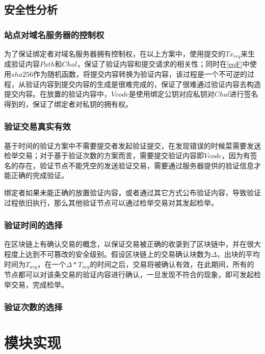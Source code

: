 \subsection{安全性分析}

\subsubsection{站点对域名服务器的控制权}

为了保证绑定者对域名服务器拥有控制权，在以上方案中，使用提交的$Tx_{req}$来生成验证内容$Path$和$Chal$，保证了验证内容和提交请求的相关性；同时在\eqref{eqF}中使用$sha256$作为随机函数，将提交内容转换为验证内容，该过程是一个不可逆的过程，从验证内容到提交内容的生成是很难完成的，保证了很难通过验证内容去构造提交内容。在放置的验证内容中，$Vcode$是使用绑定公钥对应私钥对$Chal$进行签名得到的，保证了绑定者对私钥的拥有权。


\subsubsection{验证交易真实有效}

基于时间的验证方案中不需要提交者发起验证提交，在发现错误的时候菜需要发送检举交易；对于基于验证次数的方案而言，需要提交验证内容即$Vcode$，因为有签名的存在，验证节点不能凭空的发送验证交易，需要通过服务器提供的验证信息才能正确的完成验证。

绑定者如果未能正确的放置验证内容，或者通过其它方式公布验证内容，导致验证过程依旧执行，那么其他验证节点可以通过检举交易对其发起检举。


\subsubsection{验证时间的选择}

在区块链上有确认交易的概念，以保证交易被正确的收录到了区块链中，并在很大程度上达到不可篡改的安全级别\supercite{nakamoto2008bitcoin}。假设区块链上的交易确认块数为$\Delta$，出块的平均时间为$T_{avg}$，在一个$\Delta*T_{avg}$的时间之后，交易将被确认有效，在此期间，所有的节点都可以对该条交易的验证内容进行确认，一旦发现不符合的现象，即可发起检举交易，完成检举。

\subsubsection{验证次数的选择}






\section{模块实现}

